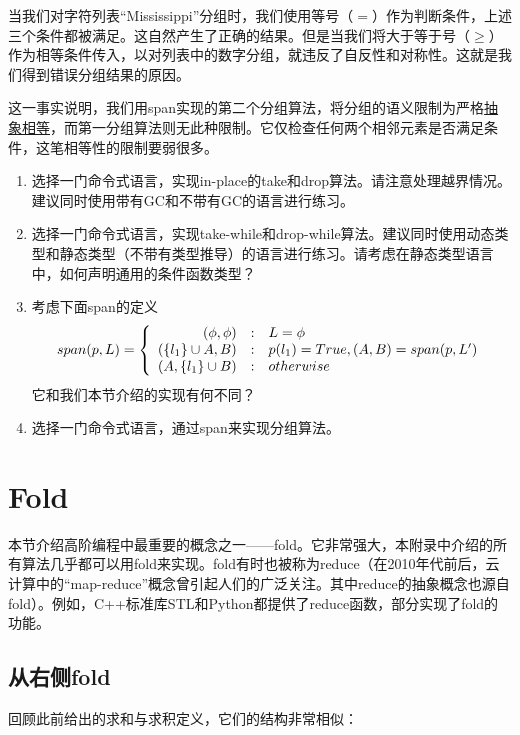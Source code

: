 \documentclass[UTF8]{article}
\begin{document}
当我们对字符列表“Mississippi”分组时，我们使用等号（$=$）作为判断条件，上述三个条件都被满足。这自然产生了正确的结果。但是当我们将大于等于号（$\geq$）作为相等条件传入，以对列表中的数字分组，就违反了自反性和对称性。这就是我们得到错误分组结果的原因。

这一事实说明，我们用span实现的第二个分组算法，将分组的语义限制为严格\underline{抽象相等}，而第一分组算法则无此种限制。它仅检查任何两个相邻元素是否满足条件，这笔相等性的限制要弱很多。

\begin{Exercise}
\begin{enumerate}
\item 选择一门命令式语言，实现in-place的take和drop算法。请注意处理越界情况。建议同时使用带有GC和不带有GC的语言进行练习。
\item 选择一门命令式语言，实现take-while和drop-while算法。建议同时使用动态类型和静态类型（不带有类型推导）的语言进行练习。请考虑在静态类型语言中，如何声明通用的条件函数类型？
\item 考虑下面span的定义
\[
span(p, L) =  \left \{
  \begin{array}
  {r@{\quad:\quad}l}
  (\phi, \phi) & L = \phi \\
  (\{ l_1 \} \cup A, B) & p(l_1) = True, (A, B) = span(p, L') \\
  (A, \{l_1\} \cup B) & otherwise
  \end{array}
\right.
\]
它和我们本节介绍的实现有何不同？
\item 选择一门命令式语言，通过span来实现分组算法。
\end{enumerate}
\end{Exercise}

\section{Fold}

本节介绍高阶编程中最重要的概念之一——fold。它非常强大，本附录中介绍的所有算法几乎都可以用fold来实现。fold有时也被称为reduce（在2010年代前后，云计算中的“map-reduce”概念曾引起人们的广泛关注。其中reduce的抽象概念也源自fold）。例如，C++标准库STL和Python都提供了reduce函数，部分实现了fold的功能。

\subsection{从右侧fold}

回顾此前给出的求和与求积定义，它们的结构非常相似：
\end{document}
